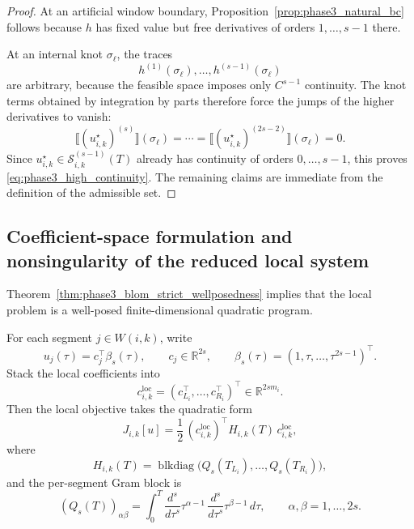 \begin{proof}
At an artificial window boundary, Proposition~\ref{prop:phase3_natural_bc} follows because
\(h\) has fixed value but free derivatives of orders \(1,\dots,s-1\) there.

At an internal knot \(\sigma_\ell\), the traces
\[
h^{(1)}(\sigma_\ell),\dots,h^{(s-1)}(\sigma_\ell)
\]
are arbitrary, because the feasible space imposes only \(C^{s-1}\) continuity.
The knot terms obtained by integration by parts therefore force the jumps of the higher derivatives to vanish:
\[
\llbracket (u_{i,k}^\star)^{(s)} \rrbracket(\sigma_\ell)
=
\cdots
=
\llbracket (u_{i,k}^\star)^{(2s-2)} \rrbracket(\sigma_\ell)
=0.
\]
Since \(u_{i,k}^\star\in \mathcal S_{i,k}^{(s-1)}(T)\) already has continuity of orders \(0,\dots,s-1\), this proves \eqref{eq:phase3_high_continuity}.
The remaining claims are immediate from the definition of the admissible set.
\end{proof}

\subsection{Coefficient-space formulation and nonsingularity of the reduced local system}
\label{subsec:phase3_coefficient_qp}

Theorem~\ref{thm:phase3_blom_strict_wellposedness} implies that the local problem is a well-posed finite-dimensional quadratic program.

For each segment \(j\in W(i,k)\), write
\[
u_j(\tau)=c_j^\top \beta_s(\tau),
\qquad
c_j\in\mathbb R^{2s},
\qquad
\beta_s(\tau)=(1,\tau,\dots,\tau^{2s-1})^\top.
\]
Stack the local coefficients into
\[
c_{i,k}^{\mathrm{loc}}
=
(c_{L_i}^\top,\dots,c_{R_i}^\top)^\top
\in\mathbb R^{2s m_i}.
\]
Then the local objective takes the quadratic form
\begin{equation}
\label{eq:phase3_local_quadratic_form}
J_{i,k}[u]
=
\frac{1}{2}\,(c_{i,k}^{\mathrm{loc}})^\top
H_{i,k}(T)\,
c_{i,k}^{\mathrm{loc}},
\end{equation}
where
\begin{equation}
\label{eq:phase3_local_hessian}
H_{i,k}(T)
=
\operatorname{blkdiag}\!\bigl(Q_s(T_{L_i}),\dots,Q_s(T_{R_i})\bigr),
\end{equation}
and the per-segment Gram block is
\begin{equation}
\label{eq:phase3_gram_block}
(Q_s(T))_{\alpha\beta}
=
\int_0^T
\frac{d^s}{d\tau^s}\tau^{\alpha-1}\,
\frac{d^s}{d\tau^s}\tau^{\beta-1}\,d\tau,
\qquad
\alpha,\beta=1,\dots,2s.
\end{equation}

